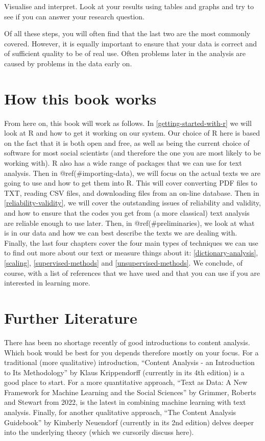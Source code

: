\documentclass[
]{book}
\begin{document}
Visualise and interpret. Look at your results using tables and graphs and try to see if you can answer your research question.

Of all these steps, you will often find that the last two are the most commonly covered. However, it is equally important to ensure that your data is correct and of sufficient quality to be of real use. Often problems later in the analysis are caused by problems in the data early on.

\section{How this book works}\label{how-this-book-works}

From here on, this book will work as follows. In \ref{getting-started-with-r} we will look at R and how to get it working on our system. Our choice of R here is based on the fact that it is both open and free, as well as being the current choice of software for most social scientists (and therefore the one you are most likely to be working with). R also has a wide range of packages that we can use for text analysis. Then in @ref(\#importing-data), we will focus on the actual texts we are going to use and how to get them into R. This will cover converting PDF files to TXT, reading CSV files, and downloading files from an on-line database. Then in \ref{reliability-validity}, we will cover the outstanding issues of reliability and validity, and how to ensure that the codes you get from (a more classical) text analysis are reliable enough to use later. Then, in @ref(\#preliminaries), we look at what is in our data and how we can best describe the texts we are dealing with. Finally, the last four chapters cover the four main types of techniques we can use to find out more about our text or measure things about it: \ref{dictionary-analysis}, \ref{scaling}, \ref{supervised-methods} and \ref{unsupervised-methods}. We conclude, of course, with a list of references that we have used and that you can use if you are interested in learning more.

\section{Further Literature}\label{further-literature}

There has been no shortage recently of good introductions to content analysis. Which book would be best for you depends therefore mostly on your focus. For a traditional (more qualitative) introduction, ``Content Analysis - an Introduction to Its Methodology'' by Klaus Krippendorff (currently in its 4th edition) is a good place to start. For a more quantitative approach, ``Text as Data: A New Framework for Machine Learning and the Social Sciences'' by Grimmer, Roberts and Stewart from 2022, is the latest in combining machine learning with text analysis. Finally, for another qualitative approach, ``The Content Analysis Guidebook'' by Kimberly Neuendorf (currently in its 2nd edition) delves deeper into the underlying theory (which we cursorily discuss here).
\end{document}
